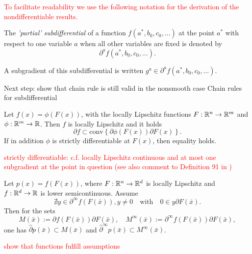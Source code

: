 \textcolor{red}{To facilitate readability we use the following notation for the derivation of the nondifferentiable results.}

The \emph{'partial' subdifferential} of a function \(f(a^*,b_0,c_0,...)\) at the point \(a^*\) with respect to one variable \(a\) when all other variables are fixed is denoted by 
\begin{equation*}
	\partial^{a} f(a^*,b_0,c_0,...).
\end{equation*}

A subgradient of this subdifferential is written \(g^{a} \in \partial^{a} f(a^*,b_0,c_0,...)\).

Next step: show that chain rule is still valid in the nonsmooth case
Chain rules for subdifferential \\

\begin{theorem}
	Let \(f(x)=\phi(F(x))\), with the locally Lipschitz functions \(F: \mathbb{R}^n \to \mathbb{R}^m\) and \(\phi:\mathbb{R}^m \to \mathbb{R}\). Then \(f\) is locally Lipschitz and it holds
	\begin{equation*}
		\partial f \subset \text{conv}\left\{\partial \phi(F(x))\partial F(x)\right\}.
	\end{equation*}
	If in addition \(\phi\) is strictly differentiable at \(F(x)\), then equality holds.
\end{theorem}

\textcolor{red}{strictly differentiable: c.f. \cite[Theorem 9.17 and 9.18]{Rockafellar2009} locally Lipschitz continuous and at most one subgradient at the point in question (see also comment to Definition 91 in \cite{Rockafellar2009})}

\begin{theorem}
	Let \(p(x) = f(F(x))\), where \(F:\mathbb{R}^n \to \mathbb{R}^d\) is locally Lipschitz and \(f:\mathbb{R}^d \to \mathbb{R}\) is lower semicontinuous. 
	Assume \[\nexists y \in \partial^{\infty}f(F(\bar{x})), y \neq 0 \quad \text{with} \quad 0 \in y \partial F(\bar{x}). \]
	Then for the sets 
	\[ M(\bar{x}):= \partial f(F(\bar{x}))\partial F(\bar{x}), \quad M^{\infty}(\bar{x}):= \partial^{\infty}f(F(\bar{x}))\partial F(\bar{x}), \]
	one has \(\hat{\partial}p(\bar{x}) \subset M(\bar{x})\) and \(\hat{\partial}^{\infty} p(\bar{x}) \subset M^{\infty}(\bar{x})\).
\end{theorem}

\textcolor{red}{show that functions fulfill assumptions}\\

